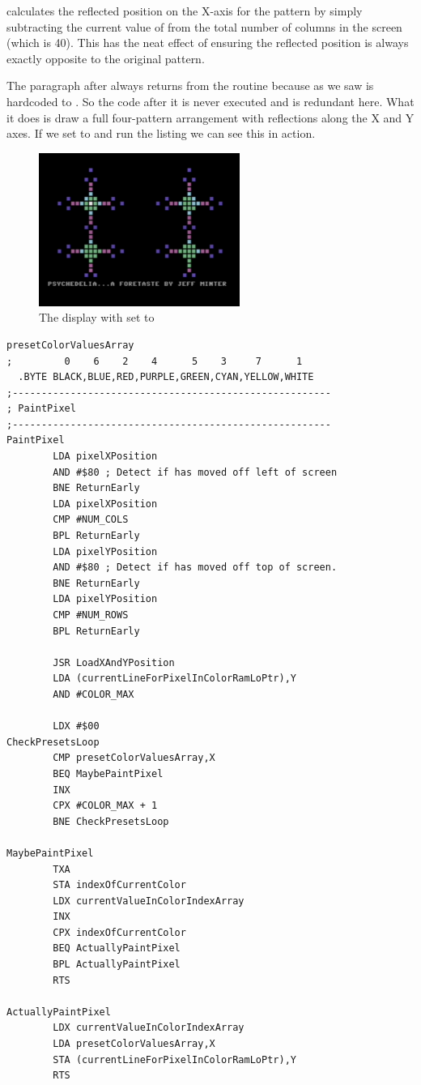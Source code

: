  calculates the reflected position on the X-axis for the pattern by simply subtracting the current value
of  from the total number of columns in the screen (which is 40). This has the neat effect of ensuring
the reflected position is always exactly opposite to the original pattern.

The paragraph after  always returns from the routine because as we saw  is
hardcoded to . So the code after it is never executed and is redundant here. What it does is draw a full four-pattern
arrangement with reflections along the X and Y axes. If we set  to  and run the
listing we can see this in action.


\begin{figure}[H]
    \centering
      \includegraphics[height=5cm]{src/listing_commentary/four_pattern.png}
  \caption*{The display with  set to }
\end{figure}


\clearpage
\begin{lstlisting}
presetColorValuesArray
;         0    6    2    4      5    3     7      1
  .BYTE BLACK,BLUE,RED,PURPLE,GREEN,CYAN,YELLOW,WHITE
;-------------------------------------------------------
; PaintPixel
;-------------------------------------------------------
PaintPixel   
        LDA pixelXPosition
        AND #$80 ; Detect if has moved off left of screen
        BNE ReturnEarly
        LDA pixelXPosition
        CMP #NUM_COLS
        BPL ReturnEarly
        LDA pixelYPosition
        AND #$80 ; Detect if has moved off top of screen.
        BNE ReturnEarly
        LDA pixelYPosition
        CMP #NUM_ROWS
        BPL ReturnEarly

        JSR LoadXAndYPosition
        LDA (currentLineForPixelInColorRamLoPtr),Y
        AND #COLOR_MAX

        LDX #$00
CheckPresetsLoop   
        CMP presetColorValuesArray,X
        BEQ MaybePaintPixel
        INX 
        CPX #COLOR_MAX + 1
        BNE CheckPresetsLoop

MaybePaintPixel   
        TXA 
        STA indexOfCurrentColor
        LDX currentValueInColorIndexArray
        INX 
        CPX indexOfCurrentColor
        BEQ ActuallyPaintPixel
        BPL ActuallyPaintPixel
        RTS 

ActuallyPaintPixel   
        LDX currentValueInColorIndexArray
        LDA presetColorValuesArray,X
        STA (currentLineForPixelInColorRamLoPtr),Y
        RTS 
\end{lstlisting}
\clearpage

